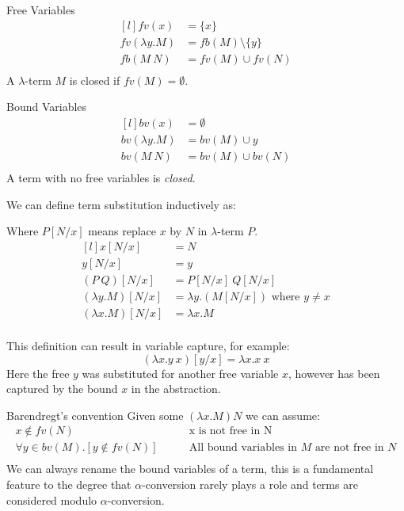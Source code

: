 \begin{tcbraster}[raster columns=2, raster equal height]
    \begin{definitionbox}{Free Variables}
        \[\begin{matrix*}[l]
            fv(x) & = \{x\} \\
            fv(\lambda y . M) & = fb(M) \setminus \{y\} \\
            fb(M \ N) &= fv(M) \cup fv(N) \\
        \end{matrix*}\]
        A $\lambda$-term $M$ is closed if $fv(M) = \emptyset$.
    \end{definitionbox}
    \begin{definitionbox}{Bound Variables}
        \[\begin{matrix*}[l]
            bv(x) &= \emptyset \\
            bv(\lambda y . M) &= bv(M) \cup y \\
            bv(M \ N) &= bv(M) \cup bv(N) \\
        \end{matrix*}\]
        A term with no free variables is \textit{closed}.
    \end{definitionbox}
\end{tcbraster}
We can define term substitution inductively as:
\\ \begin{minipage}{.45\textwidth}
    Where $P[N/x]$ means replace $x$ by $N$ in $\lambda$-term $P$.
    \[\begin{matrix*}[l]
        x[N/x] & = N \\
        y[N/x] & = y \\
        (P \ Q)[N/x] & = P[N/x] \ Q[N/x] \\
        (\lambda y . M)[N/x] &= \lambda y.(M[N/x]) \text{ where } y \neq x \\
        (\lambda x . M)[N/x] &= \lambda x.M \\
    \end{matrix*}\]
\end{minipage}
\begin{minipage}{.55\textwidth}
    This definition can result in variable capture, for example:
    \[(\lambda x . y \ x) [y/x] = \lambda x . x \ x\]
    Here the free $y$ was substituted for another free variable $x$, however has been captured by the bound $x$ in the abstraction.
\end{minipage}
\begin{definitionbox}{Barendregt's convention}
    Given some $(\lambda x . M) N$ we can assume:
    \[\begin{split}
        x \not\in fv(N) & \qquad \text{x is not free in N} \\
        \forall y \in bv(M) . [y \not\in fv(N)] & \qquad \text{All bound variables in }M\text{ are not free in }N \\
    \end{split}\]
    We can always rename the bound variables of a term, this is a fundamental feature to the degree that $\alpha$-conversion rarely plays a role and terms are considered modulo $\alpha$-conversion.
\end{definitionbox}
